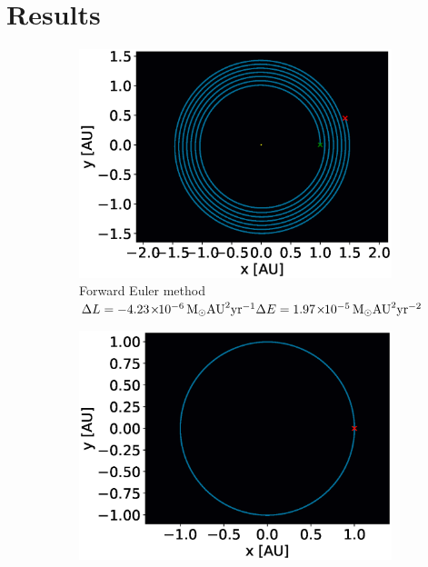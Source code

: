 \documentclass[a4paper,10pt,twocolumn]{article}
\newcommand{\ee}[1]{\!\times\!\!10^{#1}} 	%
\newcommand{\un}[1]{\,\si{#1}}		%
\begin{document}
\section*{Results}
\begin{figure}[b]
	\centering
	\begin{subfigure}{.33\textwidth}
		\centering
		\includegraphics[width=\linewidth]{es10e4.eps}
		\caption{Forward Euler method\\
	 		$
			\Delta L = -4.23\ee{-6} \un{M_\odot AU^2yr^{-1}}
			\\\Delta E = 1.97\ee{-5} \un{M_\odot AU^2 yr^{-2}}
			$}
	\end{subfigure}%
	\begin{subfigure}{.33\textwidth}
		\centering
		\includegraphics[width=\linewidth]{es10ec4.eps}

\end{subfigure}
\end{figure}
\end{document}
